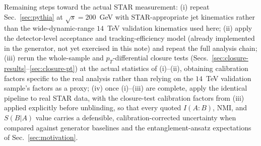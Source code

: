 \documentclass[11pt]{article}
\newcommand{\SBA}{S(B|A)}
\newcommand{\NMI}{\mathrm{NMI}}
\begin{document}
Remaining steps toward the actual STAR measurement: (i) repeat
Sec.~\ref{sec:pythia} at $\sqrt{s}=200$~GeV with STAR-appropriate jet
kinematics rather than the wide-dynamic-range $14$~TeV validation
kinematics used here; (ii) apply the detector-level acceptance and
tracking-efficiency model (already implemented in the generator, not yet
exercised in this note) and repeat the full analysis chain; (iii) rerun
the whole-sample and $p_T$-differential closure tests
(Secs.~\ref{sec:closure-results}--\ref{sec:closure-pt}) at the actual
statistics of (i)--(ii), obtaining calibration factors specific to the
real analysis rather than relying on the $14$~TeV validation sample's
factors as a proxy; (iv) once (i)--(iii) are complete, apply the
identical pipeline to real STAR data, with the closure-test calibration
factors from (iii) applied explicitly before unblinding, so that every
quoted $I(A{:}B)$, $\NMI$, and $\SBA$ value carries a defensible,
calibration-corrected uncertainty when compared against generator
baselines and the entanglement-ansatz expectations of
Sec.~\ref{sec:motivation}.
\end{document}
